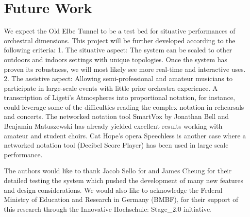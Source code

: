 \section{Future Work}
We expect the Old Elbe Tunnel to be a test bed for situative performances of orchestral dimensions. This project will be further developed according to the following criteria: 
1. The situative aspect: The system can be scaled to other outdoors and indoors settings with unique topologies. Once the system has proven its robustness, we will  most likely see more real-time and interactive uses.
2. The assistive aspect: Allowing semi-professional and amateur musicians to participate in large-scale events with little prior orchestra experience. A transcription of Ligeti's Atmospheres into proportional notation, for instance, could leverage some of the difficulties reading the complex notation in rehearsals and concerts. The networked notation tool SmartVox by Jonathan Bell and Benjamin Matuszewski has already yielded excellent results working with amateur and student choirs. Cat Hope's opera Speechless is another case where a networked notation tool (Decibel Score Player) has been used in large scale performance.
 


\begin{acknowledgments}
The authors would like to thank Jacob Sello for and James Cheung for their detailed testing the system which pushed the development of many new features and design considerations. We would also like to acknowledge the Federal Ministry of Education and Research in Germany (BMBF), for their support of this research through the Innovative Hochschule: Stage\_2.0 initiative.
\end{acknowledgments} 

\balance






